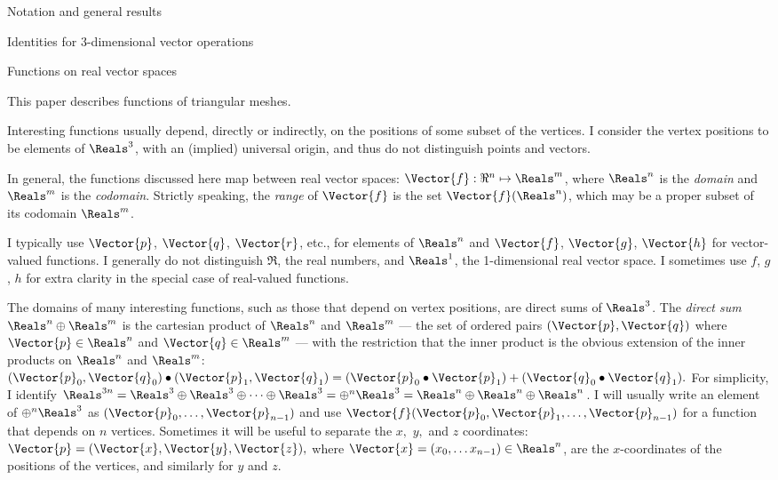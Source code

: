 \begin{plSection}{Notation and general results}
\begin{plSection}{Identities for 3-dimensional vector operations}
\end{plSection}%
\begin{plSection}{Functions on real vector spaces}
\label{sec:functions}

This paper describes functions of triangular meshes.

Interesting functions usually depend, directly or indirectly,
on the positions of some subset of the vertices.
I consider the vertex positions to be elements of $\Reals^3$,
with an (implied) universal origin,
and thus do not distinguish points and vectors.

In general, the functions discussed here map between real vector spaces:
$\Vector{f}:{\Re}^{n} \mapsto \Reals^{m}$, where $\Reals^n$ is the
{\it domain} and $\Reals^m$ is the {\it codomain}.
Strictly speaking, the {\it range} of $\Vector{f}$ is the set $\Vector{f}(\Reals^n)$,
which may be a proper subset of its codomain $\Reals^m$.

I typically use $\Vector{p}$, $\Vector{q}$, $\Vector{r}$, etc., for elements of $\Reals^n$
and
$\Vector{f}$, $\Vector{g}$, $\Vector{h}$ for vector-valued functions.
I generally do not distinguish $\Re$, the real numbers,
and $\Reals^1$, the 1-dimensional real vector space.
I sometimes use $f$, $g$, $h$ for extra clarity in the special
case of real-valued functions.

The domains of many interesting functions,
such as those that depend on vertex positions,
are direct sums of $\Reals^3$.
The {\it direct sum} $\Reals^n \oplus \Reals^m$ is the cartesian product
of $\Reals^n$ and $\Reals^m$ --- the set of ordered pairs $(\Vector{p},\Vector{q})$
where $\Vector{p} \in \Reals^n$ and $\Vector{q} \in \Reals^m$ ---
with the restriction that the inner product is the obvious extension of the
inner products on $\Reals^n$ and $\Reals^m$:
$(\Vector{p}_0,\Vector{q}_0) \bullet (\Vector{p}_1,\Vector{q}_1) = (\Vector{p}_0 \bullet \Vector{p}_1) + (\Vector{q}_0 \bullet \Vector{q}_1).$
For simplicity, I identify
$\Reals^{3n} = \Reals^3 \oplus \Reals^3 \oplus \cdots \oplus \Reals^3 = \oplus^n \Reals^3
= \Reals^n \oplus \Reals^n \oplus \Reals^n $.
I will usually write an element of $\oplus^n \Reals^3$ as
$(\Vector{p}_0,\ldots,\Vector{p}_{n-1})$
and use
$\Vector{f}(\Vector{p}_0,\Vector{p}_1,\ldots,\Vector{p}_{n-1})$
for a function that depends on $n$ vertices.
Sometimes it will be useful to separate the $x,$ $y,$ and $z$ coordinates:
$\Vector{p} = (\Vector{x},\Vector{y},\Vector{z}),$
where $\Vector{x} =(x_0, \ldots x_{n-1}) \in \Reals^n$, are the $x$-coordinates
of the positions of the vertices, and similarly for $y$ and $z$.


\end{plSection}
\end{plSection}
